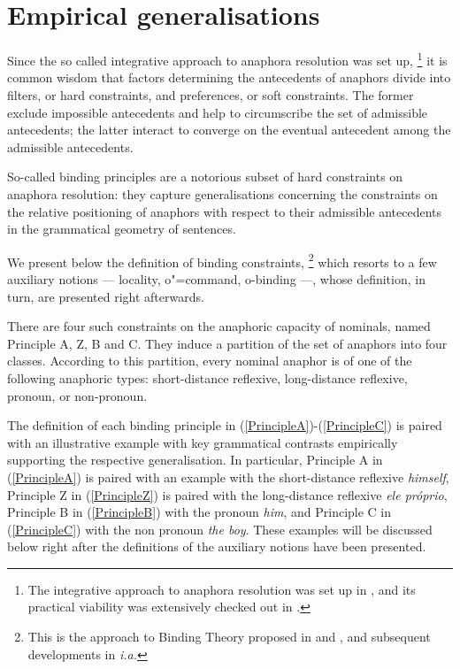 \documentclass[output=paper
	        ,collection
	        ,collectionchapter
 	        ,biblatex
                ,babelshorthands
                ,newtxmath
                ,draftmode
                ,colorlinks, citecolor=brown
]{langscibook}
\begin{document}
\section{Empirical generalisations \label{spec}}



Since the so called integrative approach to anaphora resolution was set up,%
\footnote{The integrative approach to anaphora resolution was set up in
\citep{carb:resol88, richluper:resol88, asher:resol89}, and its practical viability
was extensively checked out in \citep{lappin:pron94, mitkov:resol97}.
}
it is common wisdom that factors determining the antecedents of anaphors divide into 
filters, or hard constraints, and preferences, or soft constraints.  The former exclude
impossible antecedents and help to circumscribe the set of admissible antecedents; 
the latter interact to converge on the eventual antecedent among the admissible antecedents. 

So-called binding principles are a notorious subset of hard constraints on anaphora resolution:  
they capture generalisations concerning the constraints on the relative positioning of anaphors 
with respect to their admissible antecedents in the grammatical geometry of sentences.  


We present below the definition of binding constraints,%
\footnote{
This is the approach
to Binding Theory proposed in \citep{polsag:binding92} and \citep[Chap.6]{polsag:hpsg94}, and subsequent developments in
\citep{xue:ziji94,branco:branch96,brancoMarrafa:subject97, manningSag:1999, wechsler:1999, 
koenig:equa99, branco:ldrefl99, richter:quant99, golde:diss99, branco:livro00, kiss:2001, branco:2002a, branco:2002b, branco:2002c} {\em i.a.}}
which resorts to a few auxiliary 
notions --- locality, o"=command, o-binding ---, whose definition, in turn, are presented right afterwards.


There are four such constraints on the anaphoric capacity of nominals, named Principle A, Z, B and C. 
They induce a partition of the set of anaphors
into four classes. According to this partition, every nominal anaphor is of one of the
following anaphoric types: short-distance reflexive, long-distance reflexive, pronoun,
or non-pronoun.

The definition of each binding principle in (\ref{PrincipleA})-(\ref{PrincipleC}) is paired with an illustrative example with 
key grammatical contrasts
empirically supporting the respective generalisation. In particular, Principle A in (\ref{PrincipleA}) is paired with an example 
with the short-distance reflexive {\em himself},  Principle Z in (\ref{PrincipleZ}) is paired with the  long-distance reflexive {\em ele pr\'{o}prio}, Principle B in (\ref{PrincipleB}) with the pronoun {\em him}, and Principle C in (\ref{PrincipleC}) with the non pronoun {\em the boy}. These examples will be discussed below right after the definitions of the auxiliary notions have been presented.
\end{document}
